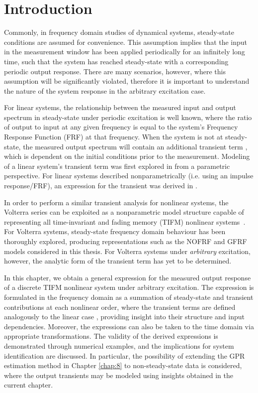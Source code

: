 \section{Introduction}

Commonly, in frequency domain studies of dynamical systems, steady-state conditions are assumed for convenience. This assumption implies that the input in the measurement window has been applied periodically for an infinitely long time, such that the system has reached steady-state with a corresponding periodic output response. There are many scenarios, however, where this assumption will be significantly violated, therefore it is important to understand the nature of the system response in the arbitrary excitation case.

For linear systems, the relationship between the measured input and output spectrum in steady-state under periodic excitation is well known, where the ratio of output to input at any given frequency is equal to the system's Frequency Response Function (FRF) at that frequency. When the system is not at steady-state, the measured output spectrum will contain an additional transient term \cite{Pintelon2012}, which is dependent on the initial conditions prior to the measurement. Modeling of a linear system's transient term was first explored in \cite{Pintelon1997} from a parametric perspective. For linear systems described nonparametrically (i.e. using an impulse response/FRF), an expression for the transient was derived in \cite{Lataire2016}. 

In order to perform a similar transient analysis for nonlinear systems, the Volterra series can be exploited as a nonparametric model structure capable of representing all time-invariant and fading memory (TIFM) nonlinear systems~\cite{Boyd1985}. For Volterra systems, steady-state frequency domain behaviour has been thoroughly explored, producing representations such as the NOFRF and GFRF models considered in this thesis. For Volterra systems under \emph{arbitrary} excitation, however, the analytic form of the transient term has yet to be determined.

In this chapter, we obtain a general expression for the measured output response of a discrete TIFM nonlinear system under arbitrary excitation. The expression is formulated in the frequency domain as a summation of steady-state and transient contributions at each nonlinear order, where the transient terms are defined analogously to the linear case \cite{Lataire2016}, providing insight into their structure and input dependencies. Moreover, the expressions can also be taken to the time domain via appropriate transformations. The validity of the derived expressions is demonstrated through numerical examples, and the implications for system identification are discussed. In particular, the possibility of extending the GPR estimation method in Chapter \ref{chap:8} to non-steady-state data is considered, where the output transients may be modeled using insights obtained in the current chapter.

